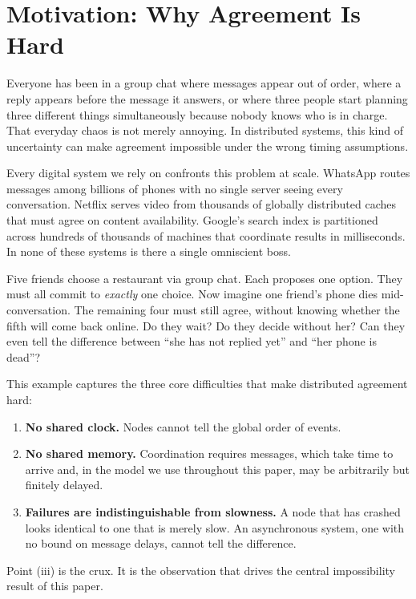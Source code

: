 \section{Motivation: Why Agreement Is Hard}\label{sec:motivation}

Everyone has been in a group chat where messages appear out of order, where a reply appears before the message it answers, or where three people start planning three different things simultaneously because nobody knows who is in charge. That everyday chaos is not merely annoying. In distributed systems, this kind of uncertainty can make agreement impossible under the wrong timing assumptions.

Every digital system we rely on confronts this problem at scale. WhatsApp routes messages among billions of phones with no single server seeing every conversation. Netflix serves video from thousands of globally distributed caches that must agree on content availability. Google's search index is partitioned across hundreds of thousands of machines that coordinate results in milliseconds. In none of these systems is there a single omniscient boss.\\[-0.8cm]
\begin{smjexample}\label{ex:restaurant}
Five friends choose a restaurant via group chat. Each proposes one option. They must all commit to \emph{exactly} one choice. Now imagine one friend's phone dies mid-conversation. The remaining four must still agree, without knowing whether the fifth will come back online. Do they wait? Do they decide without her? Can they even tell the difference between ``she has not replied yet'' and ``her phone is dead''?\\[-0.8cm]
\end{smjexample}
This example captures the three core difficulties that make distributed agreement hard:
\begin{enumerate}[label=(\roman*)]
    \item \textbf{No shared clock.} Nodes cannot tell the global order of events.
    \item \textbf{No shared memory.} Coordination requires messages, which take time to arrive and, in the model we use throughout this paper, may be arbitrarily but finitely delayed.
    \item \textbf{Failures are indistinguishable from slowness.} A node that has crashed looks identical to one that is merely slow. An asynchronous system, one with no bound on message delays, cannot tell the difference.
\end{enumerate}
Point (iii) is the crux. It is the observation that drives the central impossibility result of this paper.


